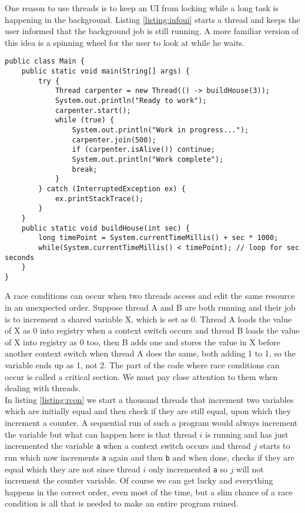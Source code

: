 One reason to use threads is to keep an UI from locking while a long task is happening in the background. Listing \ref{listing:infoui} starts a thread and keeps the user informed that the background job is still running. A more familiar version of this idea is a spinning wheel for the user to look at while he waits.

\begin{lstlisting}[style=A_Java, caption={UI keeping user informed on progress}, label={listing:infoui}]
public class Main {
    public static void main(String[] args) {
        try {
            Thread carpenter = new Thread(() -> buildHouse(3));
            System.out.println("Ready to work");
            carpenter.start();
            while (true) {
                System.out.println("Work in progress...");
                carpenter.join(500);
                if (carpenter.isAlive()) continue;
                System.out.println("Work complete");
                break;
            }
        } catch (InterruptedException ex) {
            ex.printStackTrace();
        }
    }
    public static void buildHouse(int sec) {
        long timePoint = System.currentTimeMillis() + sec * 1000;
        while(System.currentTimeMillis() < timePoint); // loop for sec seconds
    }
}
\end{lstlisting}

A race conditions can occur when two threads access and edit the same resource in an unexpected order. Suppose thread A and B are both running and their job is to increment a shared variable X, which is set as 0. Thread A loads the value of X as 0 into registry when a context switch occurs and thread B loads the value of X into registry as 0 too, then B adds one and stores the value in X before another context switch when thread A does the same, both adding 1 to 1, so the variable ends up as 1, not 2. The part of the code where race conditions can occur is called a critical section. We must pay close attention to them when dealing with threads.\\

In listing \ref{listing:rcon} we start a thousand threads that increment two variables which are initially equal and then check if they are still equal, upon which they increment a counter. A sequential run of such a program would always increment the variable but what can happen here is that thread $i$ is running and has just incremented the variable \texttt{a} when a context switch occurs and thread $j$ starts to run which now increments \texttt{a} again and then \texttt{b} and when done, checks if they are equal which they are not since thread $i$ only incremented \texttt{a} so $j$ will not increment the counter variable. Of course we can get lucky and everything happens in the correct order, even most of the time, but a slim chance of a race condition is all that is needed to make an entire program ruined.  

